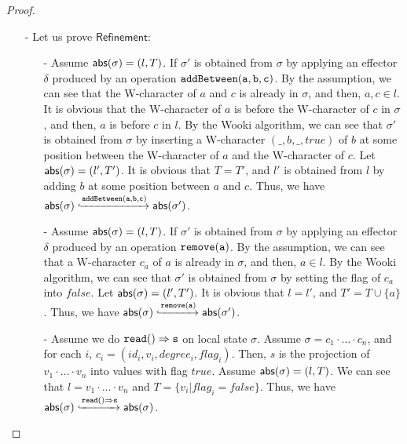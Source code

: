 \begin {proof}
\begin{itemize}
\item[-] Let us prove $\mathsf{Refinement}$:
    \begin{itemize}
    \setlength{\itemsep}{0.5pt}
    \item[-] Assume $\mathsf{abs}(\sigma) = (l,T)$. If $\sigma'$ is obtained from $\sigma$ by applying an effector $\delta$ produced by an operation $\alabelshort[{\tt addBetween}]{a,b,c}$. By the {} assumption, we can see that the W-character of $a$ and $c$ is already in $\sigma$, and then, $a,c \in l$. It is obvious that the W-character of $a$ is before the W-character of $c$ in $\sigma$, and then, $a$ is before $c$ in $l$. By the Wooki algorithm, we can see that $\sigma'$ is obtained from $\sigma$ by inserting a W-character $(\_,b,\_,\mathit{true})$ of $b$ at some position between the W-character of $a$ and the W-character of $c$. Let $\mathsf{abs}(\sigma) = (l',T')$. It is obvious that $T=T'$, and $l'$ is obtained from $l$ by adding $b$ at some position between $a$ and $c$. Thus, we have $\refmap(\sigma) \specarrow{\alabelshort[{\tt addBetween}]{a,b,c}} \refmap(\sigma')$.

    \item[-] Assume $\mathsf{abs}(\sigma) = (l,T)$. If $\sigma'$ is obtained from $\sigma$ by applying an effector $\delta$ produced by an operation $\alabelshort[{\tt remove}]{a}$. By the {} assumption, we can see that a W-character $c_a$ of $a$ is already in $\sigma$, and then, $a \in l$. By the Wooki algorithm, we can see that $\sigma'$ is obtained from $\sigma$ by setting the flag of $c_a$ into $\mathit{false}$. Let $\mathsf{abs}(\sigma) = (l',T')$. It is obvious that $l=l'$, and $T' = T \cup \{ a \}$. Thus, we have $\refmap(\sigma) \specarrow{\alabelshort[{\tt remove}]{a}} \refmap(\sigma')$.

    \item[-] Assume we do $\alabellong[{\tt read}]{}{s}{}$ on local state $\sigma$. Assume $\sigma = c_1 \cdot \ldots \cdot c_n$, and for each $i$, $c_i = (id_i,v_i,degree_i,flag_i)$. Then, $s$ is the projection of $v_1 \cdot \ldots \cdot v_n$ into values with flag $\mathit{true}$. Assume $\mathsf{abs}(\sigma) = (l,T)$. We can see that $l = v_1 \cdot \ldots \cdot v_n$ and $T = \{ v_i \vert flag_i = \mathit{false} \}$. Thus, we have $\refmap(\sigma) \specarrow{\alabellong[{\tt read}]{}{s}{}} \refmap(\sigma)$.
    \end{itemize}


\end{itemize}
\end{proof}
